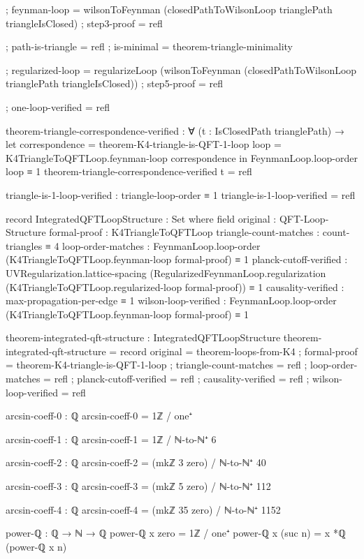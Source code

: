 \documentclass[11pt,a4paper]{book}
\begin{document}
\begin{code}
{  ; feynman-loop = wilsonToFeynman (closedPathToWilsonLoop trianglePath triangleIsClosed)
  ; step3-proof = refl
  
  ; path-is-triangle = refl
  ; is-minimal = theorem-triangle-minimality
  
  ; regularized-loop = regularizeLoop (wilsonToFeynman (closedPathToWilsonLoop trianglePath triangleIsClosed))
  ; step5-proof = refl
  
  ; one-loop-verified = refl
  }

theorem-triangle-correspondence-verified : 
  ∀ (t : IsClosedPath trianglePath) →
  let correspondence = theorem-K4-triangle-is-QFT-1-loop
      loop = K4TriangleToQFTLoop.feynman-loop correspondence
  in FeynmanLoop.loop-order loop ≡ 1
theorem-triangle-correspondence-verified t = refl

triangle-is-1-loop-verified : triangle-loop-order ≡ 1
triangle-is-1-loop-verified = refl

record IntegratedQFTLoopStructure : Set where
  field
    original : QFT-Loop-Structure
    formal-proof : K4TriangleToQFTLoop
    triangle-count-matches : count-triangles ≡ 4
    loop-order-matches : FeynmanLoop.loop-order (K4TriangleToQFTLoop.feynman-loop formal-proof) ≡ 1
    planck-cutoff-verified : UVRegularization.lattice-spacing 
                           (RegularizedFeynmanLoop.regularization 
                             (K4TriangleToQFTLoop.regularized-loop formal-proof)) ≡ 1
    causality-verified : max-propagation-per-edge ≡ 1
    wilson-loop-verified : FeynmanLoop.loop-order (K4TriangleToQFTLoop.feynman-loop formal-proof) ≡ 1

theorem-integrated-qft-structure : IntegratedQFTLoopStructure
theorem-integrated-qft-structure = record
  { original = theorem-loops-from-K4
  ; formal-proof = theorem-K4-triangle-is-QFT-1-loop
  ; triangle-count-matches = refl
  ; loop-order-matches = refl
  ; planck-cutoff-verified = refl
  ; causality-verified = refl
  ; wilson-loop-verified = refl
  }

arcsin-coeff-0 : ℚ
arcsin-coeff-0 = 1ℤ / one⁺

arcsin-coeff-1 : ℚ  
arcsin-coeff-1 = 1ℤ / ℕ-to-ℕ⁺ 6

arcsin-coeff-2 : ℚ
arcsin-coeff-2 = (mkℤ 3 zero) / ℕ-to-ℕ⁺ 40

arcsin-coeff-3 : ℚ
arcsin-coeff-3 = (mkℤ 5 zero) / ℕ-to-ℕ⁺ 112

arcsin-coeff-4 : ℚ
arcsin-coeff-4 = (mkℤ 35 zero) / ℕ-to-ℕ⁺ 1152

power-ℚ : ℚ → ℕ → ℚ
power-ℚ x zero = 1ℤ / one⁺
power-ℚ x (suc n) = x *ℚ (power-ℚ x n)


\end{code}
\end{document}
